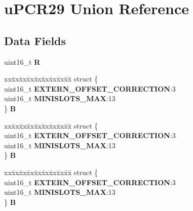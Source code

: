\hypertarget{unionuPCR29}{}\section{u\+P\+C\+R29 Union Reference}
\label{unionuPCR29}
\subsection*{Data Fields}
\begin{DoxyCompactItemize}
\item 
\mbox{\label{unionuPCR29_acaa44801b41e0de32624399fa9d7323a}} 
uint16\+\_\+t {\bfseries R}
\item 
\mbox{\label{unionuPCR29_a2e6971b6d667a6bbc8fc39dbf19b7c97}} 
\begin{tabbing}
xx\=xx\=xx\=xx\=xx\=xx\=xx\=xx\=xx\=\kill
struct \{\\
\>uint16\_t {\bfseries EXTERN\_OFFSET\_CORRECTION}:3\\
\>uint16\_t {\bfseries MINISLOTS\_MAX}:13\\
\} {\bfseries B}\\

\end{tabbing}\item 
\mbox{\label{unionuPCR29_aae9f1fae41f4cefe8e799394c229c866}} 
\begin{tabbing}
xx\=xx\=xx\=xx\=xx\=xx\=xx\=xx\=xx\=\kill
struct \{\\
\>uint16\_t {\bfseries EXTERN\_OFFSET\_CORRECTION}:3\\
\>uint16\_t {\bfseries MINISLOTS\_MAX}:13\\
\} {\bfseries B}\\

\end{tabbing}\item 
\mbox{\label{unionuPCR29_aef299f40dc83bbbc770548a4485377f2}} 
\begin{tabbing}
xx\=xx\=xx\=xx\=xx\=xx\=xx\=xx\=xx\=\kill
struct \{\\
\>uint16\_t {\bfseries EXTERN\_OFFSET\_CORRECTION}:3\\
\>uint16\_t {\bfseries MINISLOTS\_MAX}:13\\
\} {\bfseries B}\\


\end{tabbing}
\end{DoxyCompactItemize}
